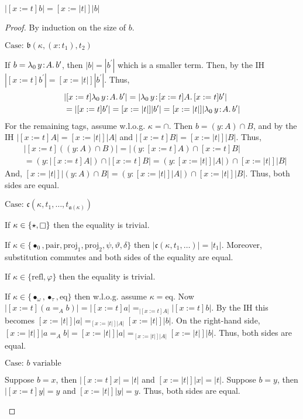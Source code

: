 \begin{lemma}
    $|[x := t]b| = [x := |t|]|b|$
    \label{lem:2:erase_subst}
\end{lemma}
\begin{proof}
    By induction on the size of $b$.

    $\text{Case: }\mathfrak{b}(\kappa, (x : t_1), t_2)$
    \begin{proofcase}
        If $b = {\lambda_0}\, y\! : \! A.\, b^\prime$, then $|b| = |b^\prime|$ which is a smaller term.
        Then, by the IH $|[x := t]b^\prime| = [x := |t|]|b^\prime|$.
        Thus,
        \begin{align*}
            &|[x := t]{\lambda_0}\, y\! : \! A.\, b^\prime| = |{\lambda_0}\, y\! : \! [x := t]A.\, [x := t]b^\prime| \\
            &= |[x := t]b^\prime| = [x := |t|]|b^\prime| = [x := |t|]|{\lambda_0}\, y\! : \! A.\, b^\prime|
        \end{align*}
        For the remaining tags, assume w.l.o.g. $\kappa = \cap$.
        Then $b = (y : A) \cap B$, and by the IH $|[x := t]A| = [x := |t|]|A|$ and $|[x := t]B| = [x := |t|]|B|$.
        Thus,
        \begin{align*}
            &|[x := t]((y : A) \cap B)| = |(y : [x := t]A) \cap [x := t]B| \\
            &= (y : |[x := t]A|) \cap |[x := t]B| = (y : [x := |t|]|A|) \cap [x := |t|]|B|
        \end{align*}
        And, $[x := |t|]|(y : A) \cap B| = (y : [x := |t|]|A|) \cap [x := |t|]|B|$.
        Thus, both sides are equal.
    \end{proofcase}

    $\text{Case: }\mathfrak{c}(\kappa, t_1, \ldots, t_{\mathfrak{a}(\kappa)})$
    \begin{proofcase}
        If $\kappa \in \{ \star, \kind \}$ then the equality is trivial.

        If $\kappa \in \{ \bullet_0, \text{pair}, \text{proj}_1, \text{proj}_2, \psi, \vartheta, \delta \}$ then $|\mathfrak{c}(\kappa, t_1, \ldots)| = |t_1|$.
        Moreover, substitution commutes and both sides of the equality are equal.

        If $\kappa \in \{ \text{refl}, \varphi \}$ then the equality is trivial.

        If $\kappa \in \{ \bullet_\omega, \bullet_\tau, \text{eq} \}$ then w.l.o.g. assume $\kappa = \text{eq}$.
        Now $|[x := t](a =_A b)| = |[x := t]a| =_{|[x := t]A|} |[x := t]b|$.
        By the IH this becomes $[x := |t|]|a| =_{[x := |t|]|A|} [x := |t|]|b|$.
        On the right-hand side, $[x := |t|]|a =_A b| = [x := |t|]|a| =_{[x := |t|]|A|} [x := |t|]|b|$.
        Thus, both sides are equal.

    \end{proofcase}

    $\text{Case: }b \text{ variable}$
    \begin{proofcase}
        Suppose $b = x$, then $|[x := t]x| = |t|$ and $[x := |t|]|x| = |t|$.
        Suppose $b = y$, then $|[x := t]y| = y$ and $[x := |t|]|y| = y$.
        Thus, both sides are equal.
    \end{proofcase}
\end{proof}

